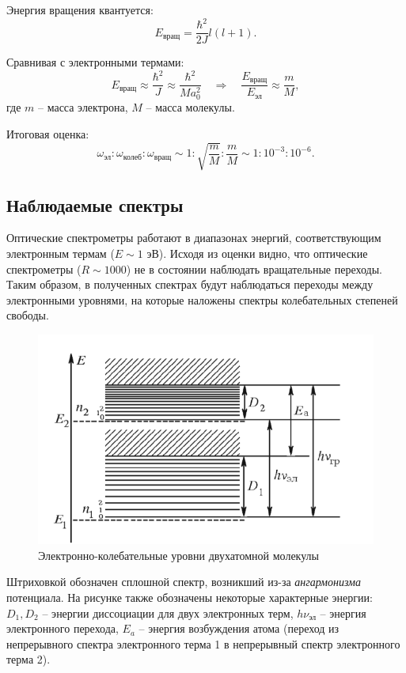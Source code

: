 \documentclass[a4paper, 12pt]{article}
\begin{document}
    Энергия вращения квантуется:
    \begin{equation}
        E_{\text{вращ}} = \frac{\hbar^2}{2J} l(l+1).
    \end{equation}

    Сравнивая с электронными термами:
    \begin{equation}
        E_{\text{вращ}} \approx \frac{\hbar^2}{J} \approx \frac{\hbar^2}{Ma_0^2} \quad \Rightarrow \quad \frac{E_{\text{вращ}}}{E_{\text{эл}}} \approx \frac{m}{M},
    \end{equation}
    где $m$ -- масса электрона, $M$ -- масса молекулы.
    
    Итоговая оценка:
    \begin{equation}
        \omega_{\text{эл}} : \omega_{\text{колеб}} : \omega_{\text{вращ}} \sim 1 : \sqrt{\frac{m}{M}} : \frac{m}{M} \sim 1 : 10^{-3} : 10^{-6}.
        \label{eq:relation}
    \end{equation}

    \subsection{Наблюдаемые спектры}

    Оптические спектрометры работают в диапазонах энергий, соответствующим электронным термам ($E \sim 1$ эВ). Исходя из оценки  видно, что оптические спектрометры ($R \sim 1000$) не в состоянии наблюдать вращательные переходы. Таким образом, в полученных спектрах будут наблюдаться переходы между электронными уровнями, на которые наложены спектры колебательных степеней свободы.

    \begin{figure}[H]
        \centering
        \includegraphics[width = 0.6\linewidth]{images/term_pair.png}
        \caption{Электронно-колебательные уровни двухатомной молекулы}
        \label{fig:term_pair}
    \end{figure}

    Штриховкой обозначен сплошной спектр, возникший из-за \textit{ангармонизма} потенциала. На рисунке также обозначены некоторые характерные энергии: $D_1, D_2$ -- энергии диссоциации для двух электронных терм, $h\nu_{\text{эл}}$ -- энергия электронного перехода, $E_a$ -- энергия возбуждения атома (переход из непрерывного спектра электронного терма 1 в непрерывный спектр электронного терма 2).
\end{document}
